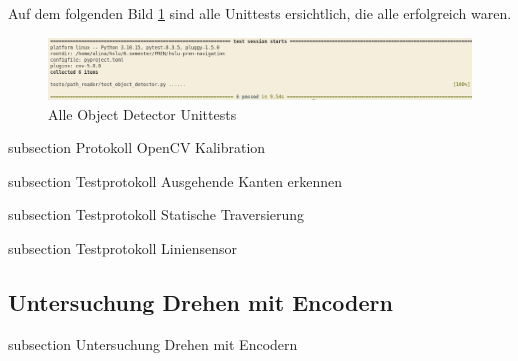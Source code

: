 Auf dem folgenden Bild \ref{img:object_detector_unittests} sind alle Unittests ersichtlich, die alle erfolgreich waren.

\begin{figure}[H]
\centering
\includegraphics[width=\textwidth]{assets/IT/testing/yolo/object-detector-unittests.png}
\caption{Alle Object Detector Unittests}
\label{img:object_detector_unittests}
\end{figure}






{subsection}
{Protokoll OpenCV Kalibration}
\label{opencv}





{subsection}
{Testprotokoll Ausgehende Kanten erkennen}
\label{outgoing-lines-test}





{subsection}
{Testprotokoll Statische Traversierung}
\label{statische-traver}




{subsection}
{Testprotokoll Liniensensor}






\newpage
\subsection*{Untersuchung Drehen mit Encodern}\label{drehen-encoder}
    {subsection}
    {Untersuchung Drehen mit Encodern}

